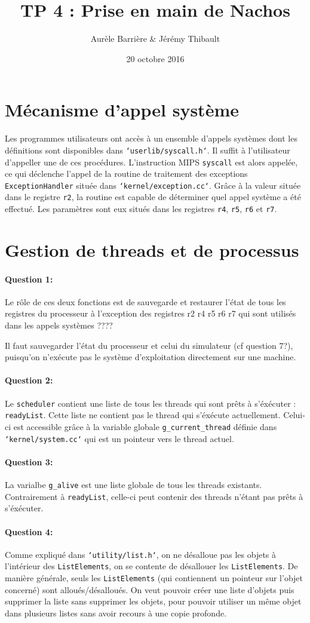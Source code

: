 \documentclass[11pt]{article}
\title{TP 4 : Prise en main de Nachos}
\author{Aurèle Barrière \& Jérémy Thibault}
\date{20 octobre 2016}
\def\question#1{\paragraph{Question #1:}}
\def\pathfile#1{\texttt{`#1`}}
\def\var#1{\texttt{#1}}
\def\func#1{\texttt{#1}}
\def\obj#1{\texttt{#1}}
\def\comment#1{\color{red}#1\color{black}}
\begin{document}
\maketitle

\section*{Mécanisme d'appel système}

Les programmes utilisateurs ont accès à un ensemble d'appels systèmes dont les définitions sont disponibles dans \pathfile{userlib/syscall.h}. Il suffit à l'utilisateur d'appeller une de ces procédures.
L'instruction MIPS \func{syscall} est alors appelée, ce qui déclenche l'appel de la routine de traitement des exceptions \func{ExceptionHandler} située dans \pathfile{kernel/exception.cc}. Grâce à la valeur située dans le registre \var{r2}, la routine est capable de déterminer quel appel système a été effectué. Les paramètres sont eux situés dans les registres \var{r4}, \var{r5}, \var{r6} et \var{r7}.


\section*{Gestion de threads et de processus}
\question{1} Le rôle de ces deux fonctions est de sauvegarde et restaurer l'état de tous les registres du processeur \comment{à l'exception des registres r2 r4 r5 r6 r7 qui sont utilisés dans les appels systèmes ????}

Il faut sauvegarder l'état du processeur et celui du simulateur \comment{(cf question 7?)}, puisqu'on n'exécute pas le système d'exploitation directement sur une machine.

\question{2} Le \obj{scheduler} contient une liste de tous les threads qui sont prêts à s'éxécuter : \var{readyList}. Cette liste ne contient pas le thread qui s'éxécute actuellement. Celui-ci est accessible grâce à la variable globale \var{g\_current\_thread} définie dans \pathfile{kernel/system.cc} qui est un pointeur vers le thread actuel.

\question{3} La varialbe \var{g\_alive} est une liste globale de tous les threads existants. Contrairement à \var{readyList}, celle-ci peut contenir des threads n'étant pas prêts à s'éxécuter.

\question{4} 
Comme expliqué dans \pathfile{utility/list.h}, on ne désalloue pas les objets à l'intérieur des \obj{ListElements}, on se contente de désallouer les \obj{ListElements}. De manière générale, seuls les \obj{ListElements} (qui contiennent un pointeur sur l'objet concerné) sont alloués/désalloués. On veut pouvoir créer une liste d'objets puis supprimer la liste sans supprimer les objets, pour pouvoir utiliser un même objet dans plusieurs listes sans avoir recours à une copie profonde.
\end{document}
